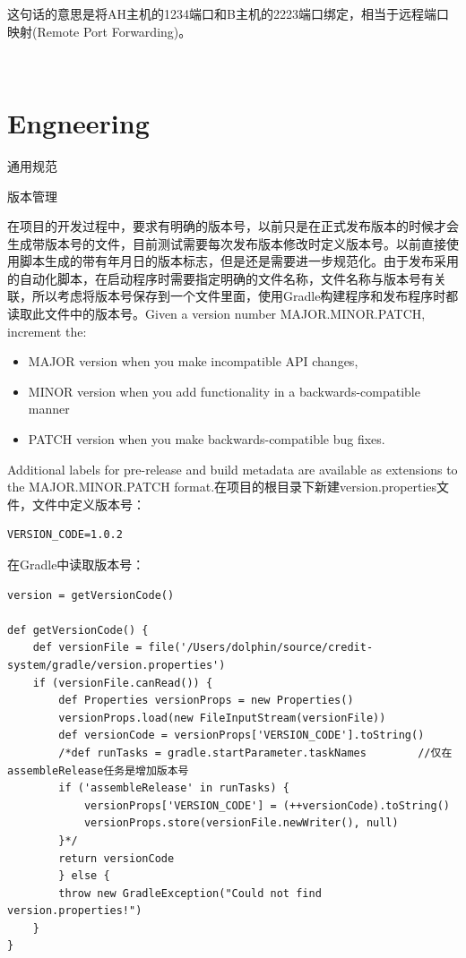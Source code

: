 \documentclass[12pt]{book}
\makeatletter
\numberwithin{dummy}{section}
\theoremstyle{ocrenumbox}
\theoremstyle{blacknumex}
\theoremstyle{blacknumbox}
\theoremstyle{ocrenum}
\renewcommand{\section}{\@startsection{section}{1}{\z@}
	{-4ex \@plus -1ex \@minus -.4ex}
	{1ex \@plus.2ex }
	{\normalfont\large\sffamily\bfseries}}
\renewcommand{\subsection}{\@startsection {subsection}{2}{\z@}
	{-3ex \@plus -0.1ex \@minus -.4ex}
	{0.5ex \@plus.2ex }
	{\normalfont\sffamily\bfseries}}
\makeatother
\begin{document}
这句话的意思是将AH主机的1234端口和B主机的2223端口绑定，相当于远程端口映射(Remote Port Forwarding)。

\newpage
~\vfill

\part{Engneering}

\section{通用规范}

\subsection{版本管理}

在项目的开发过程中，要求有明确的版本号，以前只是在正式发布版本的时候才会生成带版本号的文件，目前测试需要每次发布版本修改时定义版本号。以前直接使用脚本生成的带有年月日的版本标志，但是还是需要进一步规范化。由于发布采用的自动化脚本，在启动程序时需要指定明确的文件名称，文件名称与版本号有关联，所以考虑将版本号保存到一个文件里面，使用Gradle构建程序和发布程序时都读取此文件中的版本号。Given a version number MAJOR.MINOR.PATCH, increment the:

\begin{itemize}
	\item{MAJOR version when you make incompatible API changes,}
	\item{MINOR version when you add functionality in a backwards-compatible manner}
	\item{PATCH version when you make backwards-compatible bug fixes.}
\end{itemize}

Additional labels for pre-release and build metadata are available as extensions to the MAJOR.MINOR.PATCH format.在项目的根目录下新建version.properties文件，文件中定义版本号：

\begin{lstlisting}
VERSION_CODE=1.0.2
\end{lstlisting}

在Gradle中读取版本号：

\begin{lstlisting}
version = getVersionCode()

def getVersionCode() {
	def versionFile = file('/Users/dolphin/source/credit-system/gradle/version.properties')
	if (versionFile.canRead()) {
		def Properties versionProps = new Properties()
		versionProps.load(new FileInputStream(versionFile))
		def versionCode = versionProps['VERSION_CODE'].toString()
		/*def runTasks = gradle.startParameter.taskNames        //仅在assembleRelease任务是增加版本号
		if ('assembleRelease' in runTasks) {
			versionProps['VERSION_CODE'] = (++versionCode).toString()
			versionProps.store(versionFile.newWriter(), null)
		}*/
		return versionCode
		} else {
		throw new GradleException("Could not find version.properties!")
	}
}
\end{lstlisting}
\end{document}
